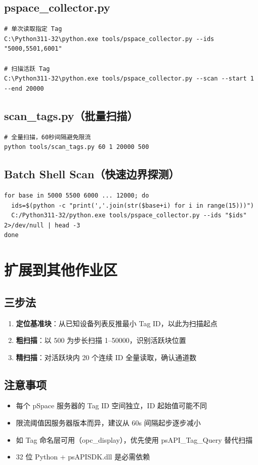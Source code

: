 \documentclass[12pt,a4paper]{ctexart}
\begin{document}
\subsection{pspace\_collector.py}
\begin{lstlisting}
# 单次读取指定 Tag
C:\Python311-32\python.exe tools/pspace_collector.py --ids "5000,5501,6001"

# 扫描活跃 Tag
C:\Python311-32\python.exe tools/pspace_collector.py --scan --start 1 --end 20000
\end{lstlisting}

\subsection{scan\_tags.py（批量扫描）}
\begin{lstlisting}
# 全量扫描，60秒间隔避免限流
python tools/scan_tags.py 60 1 20000 500
\end{lstlisting}

\subsection{Batch Shell Scan（快速边界探测）}
\begin{lstlisting}
for base in 5000 5500 6000 ... 12000; do
  ids=$(python -c "print(','.join(str($base+i) for i in range(15)))")
  C:/Python311-32/python.exe tools/pspace_collector.py --ids "$ids" 2>/dev/null | head -3
done
\end{lstlisting}

\section{扩展到其他作业区}

\subsection{三步法}
\begin{enumerate}[leftmargin=*]
  \item \textbf{定位基准块}：从已知设备列表反推最小 Tag ID，以此为扫描起点
  \item \textbf{粗扫描}：以 500 为步长扫描 1--50000，识别活跃块位置
  \item \textbf{精扫描}：对活跃块内 20 个连续 ID 全量读取，确认通道数
\end{enumerate}

\subsection{注意事项}
\begin{itemize}[leftmargin=*]
  \item 每个 pSpace 服务器的 Tag ID 空间独立，ID 起始值可能不同
  \item 限流阈值因服务器版本而异，建议从 60s 间隔起步逐步减小
  \item 如 Tag 命名层可用（opc\_display），优先使用 psAPI\_Tag\_Query 替代扫描
  \item 32 位 Python + psAPISDK.dll 是必需依赖
\end{itemize}
\end{document}
